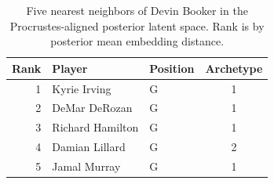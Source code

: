 \begin{table}[htbp]
  \centering\small
  \begin{tabular}{rllc}
    \toprule
    Rank & Player & Position & Archetype \\
    \midrule
    1 & Kyrie Irving & G & 1 \\
    2 & DeMar DeRozan & G & 1 \\
    3 & Richard Hamilton & G & 1 \\
    4 & Damian Lillard & G & 2 \\
    5 & Jamal Murray & G & 1 \\
    \bottomrule
  \end{tabular}
  \caption{Five nearest neighbors of Devin Booker in the Procrustes-aligned posterior latent space. Rank is by posterior mean embedding distance.}
  \label{tab:Devin_Booker_neighbors}
\end{table}

